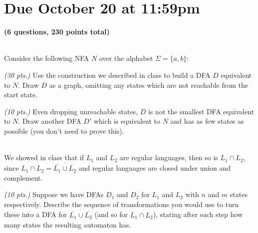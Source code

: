 \documentclass[11pt]{article}
\begin{document}
\maketitle

\section*{Due October 20 at 11:59pm}

\textbf{(6 questions, 230 points total)}

\begin{qunlist}


\\
Consider the following NFA $N$ over the alphabet $\Sigma = \{a,b\}$:


\begin{qparts}
\item \emph{(30 pts.)}
Use the construction we described in class to build a DFA $D$ equivalent to $N$.
Draw $D$ as a graph, omitting any states which are not reachable from the start state.

\item \emph{(10 pts.)}
Even dropping unreachable states, $D$ is not the smallest DFA equivalent to $N$.
Draw another DFA $D'$ which is equivalent to $N$ and has as few states as possible (you don't need to prove this).
\end{qparts}

\newpage

\\
We showed in class that if $L_1$ and $L_2$ are regular languages, then so is $L_1 \cap L_2$, since $L_1 \cap L_2 = \overline{\overline{L_1} \cup \overline{L_2}}$ and regular languages are closed under union and complement.
\begin{qparts}
\item \emph{(10 pts.)}
Suppose we have DFAs $D_1$ and $D_2$ for $L_1$ and $L_2$ with $n$ and $m$ states respectively.
Describe the sequence of transformations you would use to turn these into a DFA for $\overline{\overline{L_1} \cup \overline{L_2}}$ (and so for $L_1 \cap L_2$), stating after each step how many states the resulting automaton has.


\end{qparts}
\end{qunlist}
\end{document}

